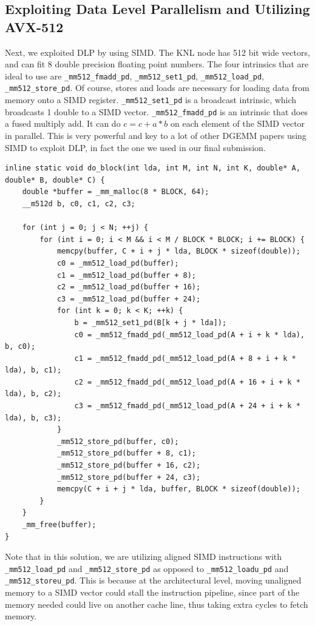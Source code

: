 \documentclass{article}
\begin{document}
\subsection{Exploiting Data Level Parallelism and Utilizing AVX-512}
Next, we exploited DLP by using SIMD. The KNL node has 512 bit wide vectors, and can fit 8 double precision floating point numbers. The four intrinsics that are ideal to use are \verb|_mm512_fmadd_pd|, \verb|_mm512_set1_pd|, \verb|_mm512_load_pd|, \verb|_mm512_store_pd|. Of course, stores and loads are necessary for loading data from memory onto a SIMD register. \verb|_mm512_set1_pd| is a broadcast intrinsic, which broadcasts 1 double to a SIMD vector. \verb|_mm512_fmadd_pd| is an intrinsic that does a fused multiply add. It can do $c = c + a * b$ on each element of the SIMD vector in parallel. This is very powerful and key to a lot of other DGEMM papers using SIMD to exploit DLP, in fact the one we used in our final submission.

\begin{verbatim}
inline static void do_block(int lda, int M, int N, int K, double* A, double* B, double* C) {
    double *buffer = _mm_malloc(8 * BLOCK, 64);
    __m512d b, c0, c1, c2, c3;

    for (int j = 0; j < N; ++j) {
        for (int i = 0; i < M && i < M / BLOCK * BLOCK; i += BLOCK) {
            memcpy(buffer, C + i + j * lda, BLOCK * sizeof(double));
            c0 = _mm512_load_pd(buffer);
            c1 = _mm512_load_pd(buffer + 8);
            c2 = _mm512_load_pd(buffer + 16);
            c3 = _mm512_load_pd(buffer + 24);
            for (int k = 0; k < K; ++k) {
                b = _mm512_set1_pd(B[k + j * lda]);
                c0 = _mm512_fmadd_pd(_mm512_load_pd(A + i + k * lda), b, c0);
                c1 = _mm512_fmadd_pd(_mm512_load_pd(A + 8 + i + k * lda), b, c1);
                c2 = _mm512_fmadd_pd(_mm512_load_pd(A + 16 + i + k * lda), b, c2);
                c3 = _mm512_fmadd_pd(_mm512_load_pd(A + 24 + i + k * lda), b, c3);
            }
            _mm512_store_pd(buffer, c0);
            _mm512_store_pd(buffer + 8, c1);
            _mm512_store_pd(buffer + 16, c2);
            _mm512_store_pd(buffer + 24, c3);
            memcpy(C + i + j * lda, buffer, BLOCK * sizeof(double));
        }
    }
    _mm_free(buffer);
}
\end{verbatim}

Note that in this solution, we are utilizing aligned SIMD instructions with \verb|_mm512_load_pd| and \verb|_mm512_store_pd| as opposed to \verb|_mm512_loadu_pd| and \verb|_mm512_storeu_pd|. This is because at the architectural level, moving unaligned memory to a SIMD vector could stall the instruction pipeline, since part of the memory needed could live on another cache line, thus taking extra cycles to fetch memory. 
\end{document}

